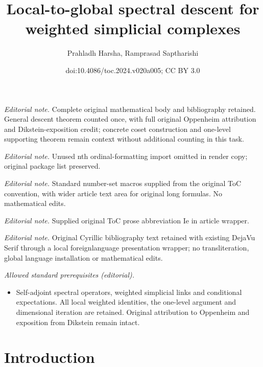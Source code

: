 \documentclass[11pt]{article}
\title{Local-to-global spectral descent for weighted simplicial complexes}
\author{Prahladh Harsha, Ramprasad Saptharishi}
\date{doi:10.4086/toc.2024.v020a005; CC BY 3.0}
\begin{document}
\maketitle
\noindent\textit{Editorial note.} Complete original mathematical body and bibliography retained. General descent theorem counted once, with full original Oppenheim attribution and Dikstein-exposition credit; concrete coset construction and one-level supporting theorem remain context without additional counting in this task.\par\medskip
\noindent\textit{Editorial note.} Unused nth ordinal-formatting import omitted in render copy; original package list preserved.\par\medskip
\noindent\textit{Editorial note.} Standard number-set macros supplied from the original ToC convention, with wider article text area for original long formulas. No mathematical edits.\par\medskip
\noindent\textit{Editorial note.} Supplied original ToC prose abbreviation Ie in article wrapper.\par\medskip
\noindent\textit{Editorial note.} Original Cyrillic bibliography text retained with existing DejaVu Serif through a local foreignlanguage presentation wrapper; no transliteration, global language installation or mathematical edits.\par\medskip
\noindent\textit{Allowed standard prerequisites (editorial).}\begin{itemize}
\item Self-adjoint spectral operators, weighted simplicial links and conditional expectations. All local weighted identities, the one-level argument and dimensional iteration are retained. Original attribution to Oppenheim and exposition from Dikstein remain intact.
\end{itemize}\medskip
\section{Introduction}
\end{document}
